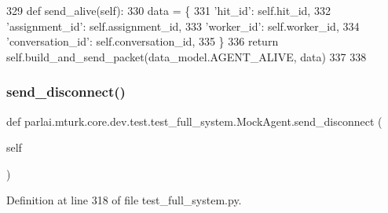\begin{DoxyCode}
329     \textcolor{keyword}{def }send\_alive(self):
330         data = \{
331             \textcolor{stringliteral}{'hit\_id'}: self.hit\_id,
332             \textcolor{stringliteral}{'assignment\_id'}: self.assignment\_id,
333             \textcolor{stringliteral}{'worker\_id'}: self.worker\_id,
334             \textcolor{stringliteral}{'conversation\_id'}: self.conversation\_id,
335         \}
336         \textcolor{keywordflow}{return} self.build\_and\_send\_packet(data\_model.AGENT\_ALIVE, data)
337 
338 
\end{DoxyCode}
\mbox{\label{classparlai_1_1mturk_1_1core_1_1dev_1_1test_1_1test__full__system_1_1MockAgent_a0ae8ffc34c8a563239335eac90dfa9ac}} 
\subsubsection{\texorpdfstring{send\+\_\+disconnect()}{send\_disconnect()}}
{\footnotesize\ttfamily def parlai.\+mturk.\+core.\+dev.\+test.\+test\+\_\+full\+\_\+system.\+Mock\+Agent.\+send\+\_\+disconnect (\begin{DoxyParamCaption}\item[{}]{self }\end{DoxyParamCaption})}



Definition at line 318 of file test\+\_\+full\+\_\+system.\+py.


